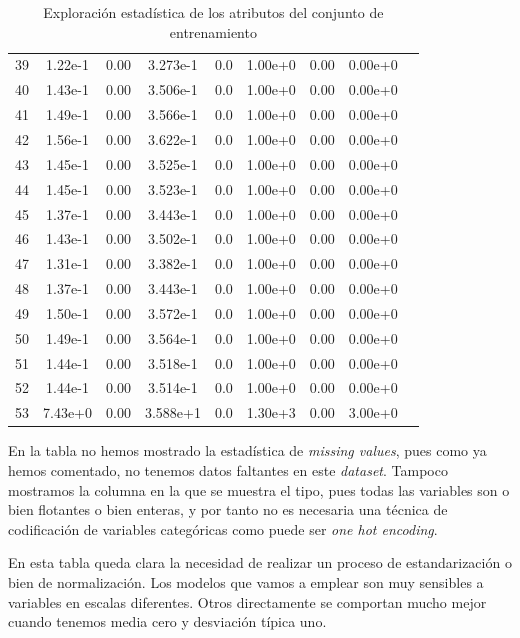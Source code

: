 \documentclass[11pt]{article}
\begin{document}
\begin{table}[H]
{\begin{tabular}{|c|c|c|c|c|c|c|c|c|}
    39   & 1.22e-1&       0.00&  3.273e-1&     0.0&  1.00e+0&      0.00&  0.00e+0 \\
    40   & 1.43e-1&       0.00&  3.506e-1&     0.0&  1.00e+0&      0.00&  0.00e+0 \\
    41   & 1.49e-1&       0.00&  3.566e-1&     0.0&  1.00e+0&      0.00&  0.00e+0 \\
    42   & 1.56e-1&       0.00&  3.622e-1&     0.0&  1.00e+0&      0.00&  0.00e+0 \\
    43   & 1.45e-1&       0.00&  3.525e-1&     0.0&  1.00e+0&      0.00&  0.00e+0 \\
    44   & 1.45e-1&       0.00&  3.523e-1&     0.0&  1.00e+0&      0.00&  0.00e+0 \\
    45   & 1.37e-1&       0.00&  3.443e-1&     0.0&  1.00e+0&      0.00&  0.00e+0 \\
    46   & 1.43e-1&       0.00&  3.502e-1&     0.0&  1.00e+0&      0.00&  0.00e+0 \\
    47   & 1.31e-1&       0.00&  3.382e-1&     0.0&  1.00e+0&      0.00&  0.00e+0 \\
    48   & 1.37e-1&       0.00&  3.443e-1&     0.0&  1.00e+0&      0.00&  0.00e+0 \\
    49   & 1.50e-1&       0.00&  3.572e-1&     0.0&  1.00e+0&      0.00&  0.00e+0 \\
    50   & 1.49e-1&       0.00&  3.564e-1&     0.0&  1.00e+0&      0.00&  0.00e+0 \\
    51   & 1.44e-1&       0.00&  3.518e-1&     0.0&  1.00e+0&      0.00&  0.00e+0 \\
    52   & 1.44e-1&       0.00&  3.514e-1&     0.0&  1.00e+0&      0.00&  0.00e+0 \\
    53   & 7.43e+0&       0.00&  3.588e+1&     0.0&  1.30e+3&      0.00&  3.00e+0 \\
    \hline
  \end{tabular}
}
\caption{Exploración estadística de los atributos del conjunto de entrenamiento}
\end{table}

En la tabla no hemos mostrado la estadística de \emph{missing values}, pues como ya hemos comentado, no tenemos datos faltantes en este \emph{dataset}. Tampoco mostramos la columna en la que se muestra el tipo, pues todas las variables son o bien flotantes o bien enteras, y por tanto no es necesaria una técnica de codificación de variables categóricas como puede ser \emph{one hot encoding}.

En esta tabla queda clara la necesidad de realizar un proceso de estandarización o bien de normalización. Los modelos que vamos a emplear son muy sensibles a variables en escalas diferentes. Otros directamente se comportan mucho mejor cuando tenemos media cero y desviación típica uno.
\end{document}
